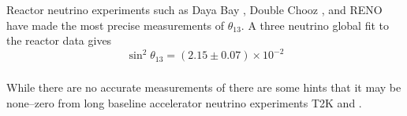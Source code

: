 {\subsubsection*{}
Reactor neutrino experiments such as Daya Bay \cite{TODO}, Double Chooz
\cite{TODO}, and RENO \cite{TODO} have made the most precise measurements of
$\theta_{13}$. A three neutrino global fit to the reactor data gives 
\cite{Capozzi:2016rtj, TODO}
\begin{equation}
	\sin^2 \theta_{13} = (2.15 \pm 0.07) \times 10^{-2}
	\label{eqn:theta_13}
\end{equation}

\subsubsection*{}
While there are no accurate measurements of \dcp{} there are some hints that it
may be none--zero from long baseline accelerator neutrino experiments T2K and
\nova{}.

}
